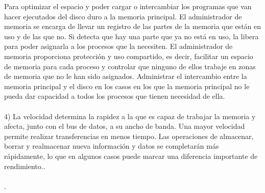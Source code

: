 \documentclass[12pt]{article}
\begin{document}
Para optimizar el espacio y poder cargar o intercambiar los programas que van hacer ejecutados del disco duro a la memoria principal.
El administrador de memoria se encarga de llevar un registro de las partes de la memoria que están en uso y de las que no. Si detecta que hay una parte que ya no está en uso, la libera para poder asignarla a los procesos que la necesiten.
El administrador de memoria proporciona  protección y uso compartido, es decir, facilitar un espacio de memoria para cada proceso y controlar que ninguno de ellos trabaje en zonas de memoria que no le han sido asignados.
Administrar el intercambio entre la memoria principal y el disco en los casos en los que la memoria principal no le pueda dar capacidad a todos los procesos que tienen necesidad de ella.
\\
\noindent
\\
4)	La velocidad determina la rapidez a la que es capaz de trabajar la memoria y afecta, junto con el bus de datos, a su ancho de banda. Una mayor velocidad permite realizar transferencias en menos tiempo. Las operaciones de almacenar, borrar y realmacenar nueva información y datos se completarán más rápidamente, lo que en algunos casos puede marcar una diferencia importante de rendimiento..\\
\noindent \cite{stallings2006,}
\\
.

    

\end{document}
